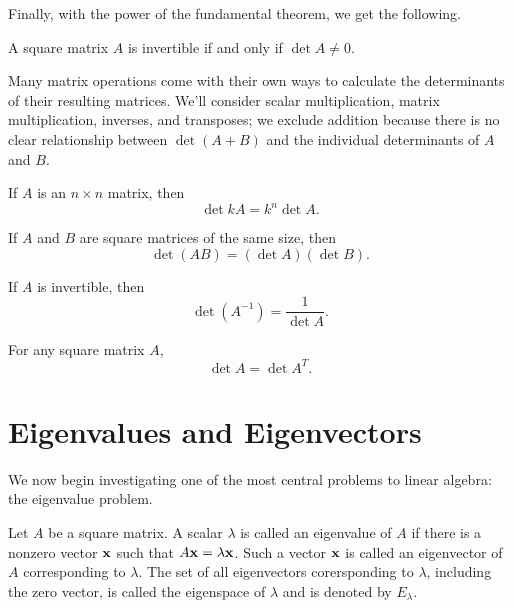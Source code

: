 \documentclass[../m73main.tex]{subfiles}
\begin{document}
Finally, with the power of the fundamental theorem, we get the following.

\begin{theorem}
	A square matrix $A$ is invertible if and only if $\det A \neq 0$.
\end{theorem}

Many matrix operations come with their own ways to calculate the determinants of their resulting matrices.
We'll consider scalar multiplication, matrix multiplication, inverses, and transposes; we exclude addition because there is no clear relationship between $\det (A + B)$ and the individual determinants of $A$ and $B$.

\begin{theorem}
	If $A$ is an $n \times n$ matrix, then
	\[ \det kA = k^n \det A. \]
\end{theorem}

\begin{theorem}
	If $A$ and $B$ are square matrices of the same size, then
	\[ \det (AB) = (\det A)(\det B). \]
\end{theorem}

\begin{theorem}
	If $A$ is invertible, then
	\[ \det (A^{-1}) = \frac{1}{\det A}. \]
\end{theorem}

\begin{theorem}
	For any square matrix $A$,
	\[ \det A = \det A^T. \]
\end{theorem}

\section{Eigenvalues and Eigenvectors}
We now begin investigating one of the most central problems to linear algebra: the eigenvalue problem.

\begin{definition}
	Let $A$ be a square matrix.
	A scalar $\lambda$ is called an eigenvalue of $A$ if there is a nonzero vector $\mathbf{x}$ such that $A \mathbf{x} = \lambda \mathbf{x}$.
	Such a vector $\mathbf{x}$ is called an eigenvector of $A$ corresponding to $\lambda$.
	The set of all eigenvectors corersponding to $\lambda$, including the zero vector, is called the eigenspace of $\lambda$ and is denoted by $E_\lambda$.
\end{definition}
\end{document}
